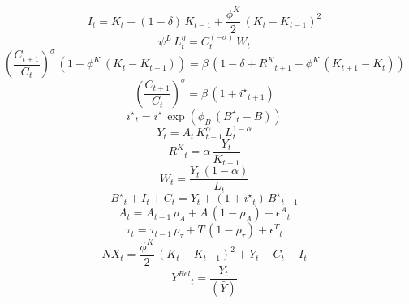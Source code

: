 \noindent[name= `Ley acumu. del capital']
\begin{dmath}
{I}_{t}={K}_{t}-\left(1-{\delta}\right)\, {K}_{t-1}+\frac{{\phi^{K}}}{2}\, \left({K}_{t}-{K}_{t-1}\right)^{2}
\end{dmath}
\noindent[name= `Oferta de trabajo']
\begin{dmath}
{\psi^L}\, {L}_{t}^{{\eta}}={C}_{t}^{\left(-{\sigma}\right)}\, {W}_{t}
\end{dmath}
\noindent[name= `Ecuación de Euler']
\begin{dmath}
\left(\frac{{C}_{t+1}}{{C}_{t}}\right)^{{\sigma}}\, \left(1+{\phi^{K}}\, \left({K}_{t}-{K}_{t-1}\right)\right)={\beta}\, \left(1-{\delta}+{R^{K}}_{t+1}-{\phi^{K}}\, \left({K}_{t+1}-{K}_{t}\right)\right)
\end{dmath}
\noindent[name= `Demanda de bonos']
\begin{dmath}
\left(\frac{{C}_{t+1}}{{C}_{t}}\right)^{{\sigma}}={\beta}\, \left(1+{i^{\star}}_{t+1}\right)
\end{dmath}
\noindent[name= `Tasa de interés deuda']
\begin{dmath}
{i^{\star}}_{t}={i^{\star}}\, \exp\left({\phi_{B}}\, \left({B^{\star}}_{t}-{B}\right)\right)
\end{dmath}
\noindent[name= `Función de producción']
\begin{dmath}
{Y}_{t}={A}_{t}\, {K}_{t-1}^{{\alpha}}\, {L}_{t}^{1-{\alpha}}
\end{dmath}
\noindent[name= `Demanda de capital']
\begin{dmath}
{R^{K}}_{t}={\alpha}\, \frac{{Y}_{t}}{{K}_{t-1}}
\end{dmath}
\noindent[name= `Demanda de trabajo']
\begin{dmath}
{W}_{t}=\frac{{Y}_{t}\, \left(1-{\alpha}\right)}{{L}_{t}}
\end{dmath}
\noindent[name= `Demanda agregada']
\begin{dmath}
{B^{\star}}_{t}+{I}_{t}+{C}_{t}={Y}_{t}+\left(1+{i^{\star}}_{t}\right)\, {B^{\star}}_{t-1}
\end{dmath}
\noindent[name= `Productividad']
\begin{dmath}
{A}_{t}={A}_{t-1}\, {\rho_{A}}+{A}\, \left(1-{\rho_{A}}\right)+{\epsilon^{A}}_{t}
\end{dmath}
\noindent[name= `Transferencias']
\begin{dmath}
{\tau}_{t}={\tau}_{t-1}\, {\rho_{\tau}}+{T}\, \left(1-{\rho_{\tau}}\right)+{\epsilon^{T}}_{t}
\end{dmath}
\noindent[name= `Exportaciones netas']
\begin{dmath}
{NX}_{t}=\frac{{\phi^{K}}}{2}\, \left({K}_{t}-{K}_{t-1}\right)^{2}+{Y}_{t}-{C}_{t}-{I}_{t}
\end{dmath}
\noindent[name= `Producción relativa al SS']
\begin{dmath}
{Y^{Rel}}_{t}=\frac{{Y}_{t}}{(\bar{Y})}
\end{dmath}
